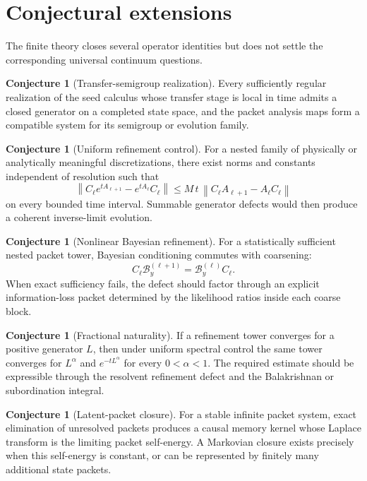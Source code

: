 \documentclass[11pt]{article}
\theoremstyle{definition}
\newtheorem{conjecture}[theorem]{Conjecture}
\theoremstyle{remark}
\newcommand{\cB}{\mathcal B}
\newcommand{\norm}[1]{\left\lVert#1\right\rVert}
\begin{document}
\section{Conjectural extensions}

The finite theory closes several operator identities but does not settle the corresponding universal continuum questions.

\begin{conjecture}[Transfer-semigroup realization]
Every sufficiently regular realization of the seed calculus whose transfer stage is local in time admits a closed generator on a completed state space, and the packet analysis maps form a compatible system for its semigroup or evolution family.
\end{conjecture}

\begin{conjecture}[Uniform refinement control]
For a nested family of physically or analytically meaningful discretizations, there exist norms and constants independent of resolution such that
\[
\norm{C_\ell e^{tA_{\ell+1}}-e^{tA_\ell}C_\ell}
\le
M\,t\,\norm{C_\ell A_{\ell+1}-A_\ell C_\ell}
\]
on every bounded time interval. Summable generator defects would then produce a coherent inverse-limit evolution.
\end{conjecture}

\begin{conjecture}[Nonlinear Bayesian refinement]
For a statistically sufficient nested packet tower, Bayesian conditioning commutes with coarsening:
\[
C_\ell\cB^{(\ell+1)}_y
=
\cB^{(\ell)}_yC_\ell.
\]
When exact sufficiency fails, the defect should factor through an explicit information-loss packet determined by the likelihood ratios inside each coarse block.
\end{conjecture}

\begin{conjecture}[Fractional naturality]
If a refinement tower converges for a positive generator $L$, then under uniform spectral control the same tower converges for $L^\alpha$ and $e^{-tL^\alpha}$ for every $0<\alpha<1$. The required estimate should be expressible through the resolvent refinement defect and the Balakrishnan or subordination integral.
\end{conjecture}

\begin{conjecture}[Latent-packet closure]
For a stable infinite packet system, exact elimination of unresolved packets produces a causal memory kernel whose Laplace transform is the limiting packet self-energy. A Markovian closure exists precisely when this self-energy is constant, or can be represented by finitely many additional state packets.
\end{conjecture}
\end{document}

